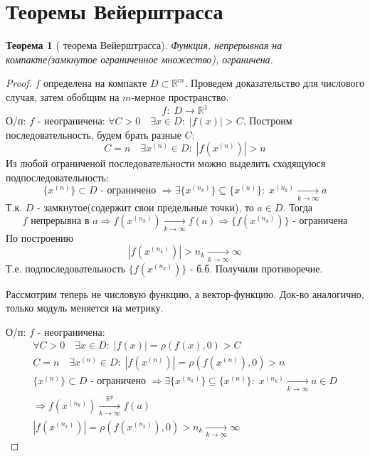 \newcommand\RRR{\ensuremath{\mathbb{R}}}
\newcommand{\rom}[1]
    {\MakeUppercase{\romannumeral #1}}
\newtheorem{theorem}{Теорема}[section]
\theoremstyle{definition}
\newtheorem{definition}{Определение}[section]
\newpage
\section{Теоремы Вейерштрасса}
    
\begin{theorem}[\rom{1} теорема Вейерштрасса]
    Функция, непрерывная на компакте(замкнутое ограниченное множество), ограничена.
\end{theorem}

\begin{proof}
    $f$ определена на компакте $D \subset \RRR^m$. Проведем доказательство для числового случая, затем обобщим на $m$-мерное пространство.
    \[
        f:\; D \rightarrow \RRR^1
    \]
    О/п: $f$ - неограничена: $\forall C > 0 \quad \exists x \in D:\;|f(x)| > C$. 
    Построим последовательность, будем брать разные $C$:
    \[
        C=n \quad \exists x^{(n)} \in D:\; |f(x^{(n)})| > n
    \]
    Из любой ограниченой последовательности можно выделить сходящуюся подпоследовательность:
    \[
        \{x^{(n)}\} \subset D\text{ - ограничено }\Rightarrow \exists \{ x^{(n_k)} \} \subseteq \{x^{(n)}\}:\; x^{(n_k)} \xrightarrow[k \rightarrow \infty]{} a
    \]
    Т.к. $D$ - замкнутое(содержит свои предельные точки), то $a \in D$. Тогда
    \[
        f \text{ непрерывна в } a \Rightarrow f(x^{(n_k)}) \xrightarrow[k \rightarrow \infty]{} f(a) \Rightarrow \{f(x^{(n_k)})\} \text{ - ограничена} 
    \]
    По построению 
    \[
        |f(x^{(n_k)})| > n_k  \xrightarrow[k \rightarrow \infty]{} \infty
    \]
    Т.е. подпоследовательность $\{f(x^{(n_k)})\}$ - б.б. Получили противоречие. 
        
    Рассмотрим теперь не числовую функцию, а вектор-функцию.
    Док-во аналогично, только модуль меняется на метрику.

    О/п: $f$ - неограничена:
    \begin{gather*}
        \forall C > 0 \quad \exists x \in D:\;|f(x)| = \rho(f(x), 0) > C\\
        C=n \quad \exists x^{(n)} \in D:\; |f(x^{(n)})| = \rho(f(x^{(n)}), 0) > n\\
        \{x^{(n)}\} \subset D\text{ - ограничено }\Rightarrow \exists \{ x^{(n_k)} \} \subseteq \{x^{(n)}\}:\; x^{(n_k)} \xrightarrow[k \rightarrow \infty]{} a \in D\\
        \Rightarrow f(x^{(n_k)}) \xrightarrow[k \rightarrow \infty]{\RRR^p} f(a)\\
        |f(x^{(n_k)})| = \rho(f(x^{(n_k)}), 0) > n_k  \xrightarrow[k \rightarrow \infty]{} \infty
    \end{gather*}

\end{proof}

